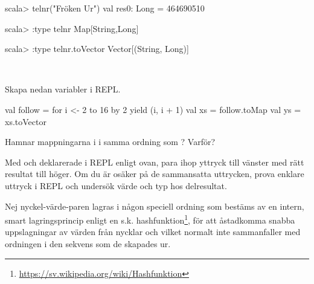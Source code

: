 \begin{REPL}
scala> telnr("Fröken Ur")
val res0: Long = 464690510

scala> :type telnr
Map[String,Long]

scala> :type telnr.toVector
Vector[(String, Long)]
\end{REPL}

\QUESTEND




\QUESTBEGIN

\Task \what~

\Subtask Skapa nedan variabler i REPL.
\begin{Code}
val follow = for i <- 2 to 16 by 2 yield (i, i + 1)
val xs = follow.toMap
val ys = xs.toVector
\end{Code}
Hamnar mappningarna i  i samma ordning som ? Varför?

\Subtask Med  och  deklarerade i REPL enligt ovan, para ihop yttryck till vänster med rätt resultat till höger. Om du är osäker på de sammansatta uttrycken, prova enklare uttryck i REPL och undersök värde och typ hos delresultat.

\begin{ConceptConnections}

\end{ConceptConnections}

\SOLUTION

\TaskSolved \what


\SubtaskSolved Nej nyckel-värde-paren lagras i någon speciell ordning som bestäms av en intern, smart lagringsprincip enligt en s.k. hashfunktion\footnote{\url{https://sv.wikipedia.org/wiki/Hashfunktion}}, för att åstadkomma snabba uppslagningar av värden från nycklar och vilket normalt inte sammanfaller med ordningen i den sekvens som de skapades ur.

\SubtaskSolved

\begin{ConceptConnections}
  
\end{ConceptConnections}



